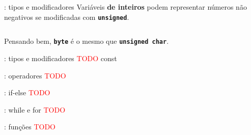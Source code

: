 \begin{frame}{\insertsection: tipos e modificadores}
  Variáveis \textbf{de inteiros} podem representar números não negativos se modificadas com \textbf{\texttt{\textcolor{CustomOrange}{unsigned}}}.
  \inputminted[firstline=4,lastline=7]{arduino}{\SketchPath{introLinguagem}}

  \pause
  Pensando bem, \textbf{\texttt{\textcolor{CustomOrange}{byte}}} é o mesmo que \textbf{\texttt{\textcolor{CustomOrange}{unsigned~char}}}.
\end{frame}


\begin{frame}{\insertsection: tipos e modificadores}
  \textcolor{red}{TODO} const
\end{frame}


\begin{frame}{\insertsection: operadores}
  \textcolor{red}{TODO}
\end{frame}


\begin{frame}{\insertsection: if-else}
  \textcolor{red}{TODO}
\end{frame}


\begin{frame}{\insertsection: while e for}
  \textcolor{red}{TODO}
\end{frame}


\begin{frame}{\insertsection: funções}
  \textcolor{red}{TODO}
\end{frame}
